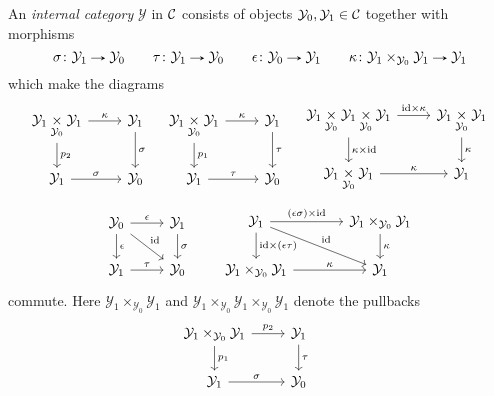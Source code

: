 \begin{appendices}
  \renewcommand{\Y}{\mathcal{Y}}
  \newcommand{\Z}{\mathcal{Z}}
  \begin{definitions}
    An \emph{internal category} $\Y$ in $\mathcal{C}$ consists of objects
    $\Y_0, \Y_1 \in \C$ together with morphisms
    \[
    \sigma \c \Y_1 \to \Y_0 \qquad
    \tau \c \Y_1 \to \Y_0 \qquad
    \epsilon \c \Y_0 \to \Y_1 \qquad
    \kappa \c \Y_1 \times_{\Y_0} \Y_1 \to \Y_1
    \]
    which make the diagrams
    \[
    \begin{tikzcd}
      \Y_1 \underset{\Y_0}{\times} \Y_1 \ar[r, "\kappa"] \ar[d, "p_2"]
      & \Y_1 \ar[d, "\sigma"] \\ \Y_1 \ar[r, "\sigma"] & \Y_0
    \end{tikzcd}
    \quad
    \begin{tikzcd}
      \Y_1 \underset{\Y_0}{\times} \Y_1 \ar[r, "\kappa"] \ar[d, "p_1"]
      & \Y_1 \ar[d, "\tau"] \\ \Y_1 \ar[r, "\tau"] & \Y_0
    \end{tikzcd}
    \quad
    \begin{tikzcd}
      \Y_1 \underset{\Y_0}{\times} \Y_1 \underset{\Y_0}{\times} \Y_1
      \ar[r, "\id \times \kappa"] \ar[d, "\kappa \times \id"] & \Y_1
      \underset{\Y_0}{\times} \Y_1 \ar[d, "\kappa"] \\ \Y_1
      \underset{\Y_0}{\times} \Y_1 \ar[r, "\kappa"] & \Y_1
    \end{tikzcd}
    \]
    \[
    \begin{tikzcd}
      \Y_0 \ar[r, "\epsilon"] \ar[d, "\epsilon"] \ar[rd, "\id"] & \Y_1
      \ar[d, "\sigma"] \\ \Y_1 \ar[r, "\tau"] & \Y_0
    \end{tikzcd}
    \qquad
    \begin{tikzcd}[column sep = large]
      \Y_1 \ar[r, "(\epsilon\sigma) \times \id"] \ar[d, "\id \times
      (\epsilon\tau)"] \ar[rd, "\id"] & \Y_1 \times_{\Y_0}
      \Y_1 \ar[d, "\kappa"] \\ \Y_1 \times_{\Y_0} \Y_1
      \ar[r, "\kappa"] & \Y_1
    \end{tikzcd}
    \]
    commute. Here $\Y_1 \times_{\Y_0} \Y_1$ and $\Y_1 \times_{\Y_0}
    \Y_1 \times_{\Y_0} \Y_1$ denote the pullbacks
    \[
    \begin{tikzcd}
      \Y_1 \times_{\Y_0} \Y_1 \ar[r, "p_2"] \ar[d, "p_1"] & \Y_1
      \ar[d, "\tau"] \\ \Y_1 \ar[r, "\sigma"] & \Y_0
    \end{tikzcd}
    \qquad
    \begin{tikzcd}

\end{tikzcd}\]
\end{definitions}
\end{appendices}
